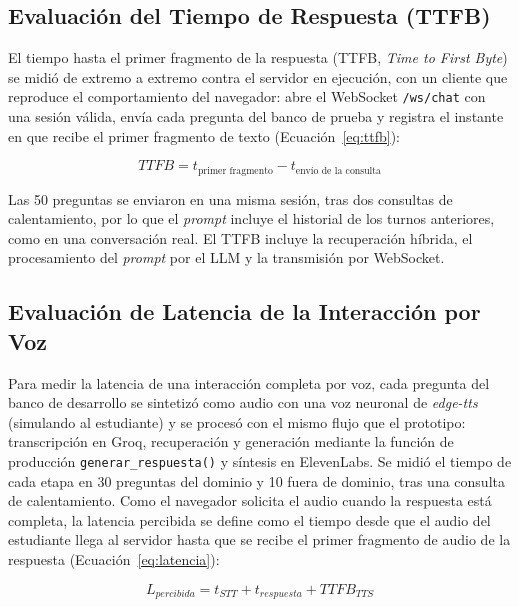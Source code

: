\subsection{Evaluación del Tiempo de Respuesta (TTFB)}
El tiempo hasta el primer fragmento de la respuesta (TTFB, \textit{Time to First Byte}) se midió de extremo a extremo contra el servidor en ejecución, con un cliente que reproduce el comportamiento del navegador: abre el WebSocket \texttt{/ws/chat} con una sesión válida, envía cada pregunta del banco de prueba y registra el instante en que recibe el primer fragmento de texto (Ecuación~\ref{eq:ttfb}):

\begin{equation}
\label{eq:ttfb}
TTFB = t_{\text{primer fragmento}} - t_{\text{envío de la consulta}}
\end{equation}

Las 50 preguntas se enviaron en una misma sesión, tras dos consultas de calentamiento, por lo que el \textit{prompt} incluye el historial de los turnos anteriores, como en una conversación real. El TTFB incluye la recuperación híbrida, el procesamiento del \textit{prompt} por el LLM y la transmisión por WebSocket.

\subsection{Evaluación de Latencia de la Interacción por Voz}
Para medir la latencia de una interacción completa por voz, cada pregunta del banco de desarrollo se sintetizó como audio con una voz neuronal de \textit{edge-tts} (simulando al estudiante) y se procesó con el mismo flujo que el prototipo: transcripción en Groq, recuperación y generación mediante la función de producción \texttt{generar\_\allowbreak{}respuesta()} y síntesis en ElevenLabs. Se midió el tiempo de cada etapa en 30 preguntas del dominio y 10 fuera de dominio, tras una consulta de calentamiento. Como el navegador solicita el audio cuando la respuesta está completa, la latencia percibida se define como el tiempo desde que el audio del estudiante llega al servidor hasta que se recibe el primer fragmento de audio de la respuesta (Ecuación~\ref{eq:latencia}):

\begin{equation}
\label{eq:latencia}
L_{percibida} = t_{STT} + t_{respuesta} + TTFB_{TTS}
\end{equation}

